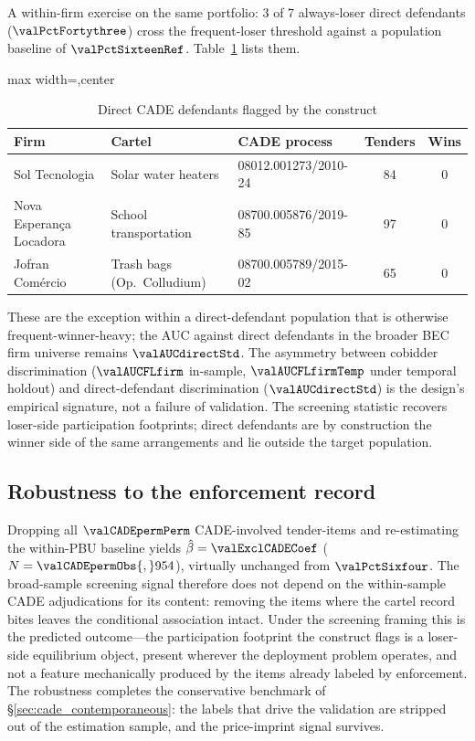 A within-firm exercise on the same portfolio: $3$ of $7$
always-loser direct defendants ($\valPctFortythree$) cross the
frequent-loser threshold against a population baseline of
$\valPctSixteenRef$. Table~\ref{tab:cade_fl_firms} lists them.

\begin{table}[htbp]
\centering
\caption{Direct CADE defendants flagged by the construct}
\label{tab:cade_fl_firms}
\begin{adjustbox}{max width=\textwidth,center}
\small
\begin{tabular}{p{3.5cm}p{4.0cm}lcc}
\toprule
Firm & Cartel & CADE process & Tenders & Wins \\
\midrule
Sol Tecnologia & Solar water heaters & 08012.001273/2010-24 & 84 & 0 \\
Nova Esperan\c{c}a Locadora & School transportation & 08700.005876/2019-85 & 97 & 0 \\
Jofran Com\'ercio & Trash bags (Op.\ Colludium) & 08700.005789/2015-02 & 65 & 0 \\
\bottomrule
\end{tabular}
\end{adjustbox}
\end{table}

These are the exception within a direct-defendant population
that is otherwise frequent-winner-heavy; the AUC against direct
defendants in the broader BEC firm universe remains
$\valAUCdirectStd$. The asymmetry between cobidder
discrimination ($\valAUCFLfirm$ in-sample,
$\valAUCFLfirmTemp$ under temporal holdout) and direct-defendant
discrimination ($\valAUCdirectStd$) is the design's empirical
signature, not a failure of validation. The screening statistic
recovers loser-side participation footprints; direct defendants
are by construction the winner side of the same arrangements
and lie outside the target population.

\subsection{Robustness to the enforcement record}
\label{sec:cade_robustness}

Dropping all $\valCADEpermPerm$ CADE-involved tender-items and
re-estimating the within-PBU baseline yields
$\hat\beta = \valExclCADECoef$ ($N = \valCADEpermObs{,}954$),
virtually unchanged from $\valPctSixfour$. The broad-sample
screening signal therefore does not depend on the within-sample
CADE adjudications for its content: removing the items where
the cartel record bites leaves the conditional association
intact. Under the screening framing this is the predicted
outcome---the participation footprint the construct flags is a
loser-side equilibrium object, present wherever the deployment
problem operates, and not a feature mechanically produced by the
items already labeled by enforcement. The robustness completes
the conservative benchmark of §\ref{sec:cade_contemporaneous}:
the labels that drive the validation are stripped out of the
estimation sample, and the price-imprint signal survives.

